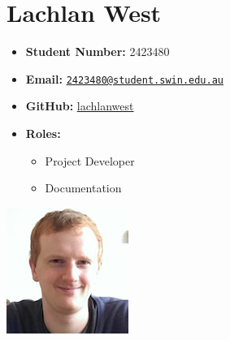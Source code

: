 \documentclass[a4paper,12pt]{article}
\providecommand{\tightlist}{%
  \setlength{\itemsep}{0pt}\setlength{\parskip}{0pt}}
\begin{document}
\begin{minipage}{0.7\textwidth}
\section{Lachlan West}\label{lachlan-west}
\begin{itemize}[label={}]
\tightlist
\item
  \textbf{Student Number:} 2423480
\item
  \textbf{Email:}
  \href{mailto:2423480@student.swin.edu.au}{\nolinkurl{2423480@student.swin.edu.au}}
\item
  \textbf{GitHub:} \href{http://www.github.com/lachlanwest}{lachlanwest}
\item
    \textbf{Roles:}
    \begin{itemize}
      \item Project Developer
      \item Documentation
    \end{itemize}
\end{itemize}
\end{minipage}%
\begin{minipage}{0.3\textwidth}
\includegraphics{./imgs/lachy.png}
\end{minipage}

\vspace{3em}
\end{document}
